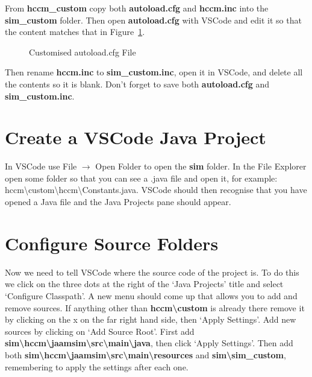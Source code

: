 \documentclass[
  10pt,
  a4paperpaper,
  DIV=11,
  numbers=noendperiod,
  oneside]{scrreprt}
\begin{document}
From \textbf{hccm\_custom} copy both \textbf{autoload.cfg} and
\textbf{hccm.inc} into the \textbf{sim\_custom} folder. Then open
\textbf{autoload.cfg} with VSCode and edit it so that the content
matches that in Figure~\ref{fig-inc}.

\begin{figure}[htbp]


\caption{\label{fig-inc}Customised autoload.cfg File}

\end{figure}%

Then rename \textbf{hccm.inc} to \textbf{sim\_custom.inc}, open it in
VSCode, and delete all the contents so it is blank. Don't forget to save
both \textbf{autoload.cfg} and \textbf{sim\_custom.inc}.

\section{Create a VSCode Java
Project}\label{create-a-vscode-java-project}

In VSCode use File \(\rightarrow\) Open Folder to open the \textbf{sim}
folder. In the File Explorer open some folder so that you can see a
.java file and open it, for example:
hccm\textbackslash custom\textbackslash hccm\textbackslash Constants.java.
VSCode should then recognise that you have opened a Java file and the
Java Projects pane should appear.

\section{Configure Source Folders}\label{configure-source-folders}

Now we need to tell VSCode where the source code of the project is. To
do this we click on the three dots at the right of the `Java Projects'
title and select `Configure Classpath'. A new menu should come up that
allows you to add and remove sources. If anything other than
\textbf{hccm\textbackslash custom} is already there remove it by
clicking on the x on the far right hand side, then `Apply Settings'. Add
new sources by clicking on `Add Source Root'. First add
\textbf{sim\textbackslash hccm\textbackslash jaamsim\textbackslash src\textbackslash main\textbackslash java},
then click `Apply Settings'. Then add both
\textbf{sim\textbackslash hccm\textbackslash jaamsim\textbackslash src\textbackslash main\textbackslash resources}
and \textbf{sim\textbackslash sim\_custom}, remembering to apply the
settings after each one.
\end{document}
